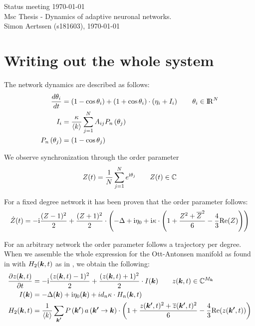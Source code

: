 


\mainmatter

Status meeting \today \\
Msc Thesis - Dynamics of adaptive neuronal networks. \\
Simon Aertssen (s181603), \today \\ 

\section{Writing out the whole system}
The network dynamics are described as follows:
\begin{align}
\frac{d \theta_i}{d t} &= (1 - \cos\theta_i) + (1 + \cos\theta_i)\cdot\left(\eta_i + I_i \right) \qquad \theta_i \in {\rm I\!R}^N \nonumber \\
I_{i} &= \frac{\kappa}{\langle k\rangle} \sum_{j=1}^{N} A_{i j} P_{n}\left(\theta_{j}\right) \label{eq:FullThetaNeuronNetwork} \\
P_{n}\left(\theta_{j}\right) &= (1 - \cos\theta_j) \nonumber
\end{align}

We observe synchronization through the order parameter
\begin{align}
Z(t) = \frac{1}{N} \sum_{j=1}^N e^{{\rm{i}}\theta_j}  \qquad Z(t) \in {\mathbb{C}} \label{eq:orderparameter}
\end{align}

For a fixed degree network it has been proven that the order parameter follows:
\begin{align}
\dot{Z}(t)= -{\rm{i}} \frac{(Z-1)^2}{2}+\frac{(Z+1)^2}{2} \cdot \left(-\Delta+ {\rm{i}}\eta_{0}
+ {\rm{i}} \kappa \cdot \left(1+\frac{Z^{2} + \overline{Z}^{2} }{6} - \frac{4}{3} {\operatorname{Re}}(Z)\right)\right) \label{eq:MeanField}
\end{align}
    
For an arbitrary network the order parameter follows a trajectory per degree. When we assemble the whole expression for the Ott-Antonsen manifold as found in \cite{OttAntonsen2017} with $H_2({\boldsymbol{k}},t)$ as in \cite{Martens2020}, we obtain the following:
\begin{align}
\frac{\partial z({\boldsymbol{k}}, t)}{\partial t} &= -{\rm{i}} \frac{(z({\boldsymbol{k}}, t)-1)^{2}}{2} + \frac{(z({\boldsymbol{k}}, t)+1)^{2}}{2} \cdot I({\boldsymbol{k}}) \qquad z({\boldsymbol{k}},t) \in {\mathbb{C}}^{M_{\boldsymbol{k}}} \nonumber \\
I({\boldsymbol{k}}) &= -\Delta({\boldsymbol{k}}) + {\rm{i}} \eta_{0}({\boldsymbol{k}}) + i d_{n} \kappa \cdot H_n({\boldsymbol{k}},t) \label{eq:OttAntonsenSystemFull} \\
H_2({\boldsymbol{k}},t) &= \frac{1}{{\langle k\rangle}} \sum_{{\boldsymbol{k'}}} P\left({\boldsymbol{k'}}\right) a\left({\boldsymbol{k'}} \rightarrow {\boldsymbol{k}}\right) \cdot \left( 1 + \frac{z({\boldsymbol{k'}}, t)^2 + \overline{z}({\boldsymbol{k'}}, t)^2}{6} - \frac{4}{3} {\operatorname{Re}}(z({\boldsymbol{k'}}, t)) \right) \nonumber
\end{align}


